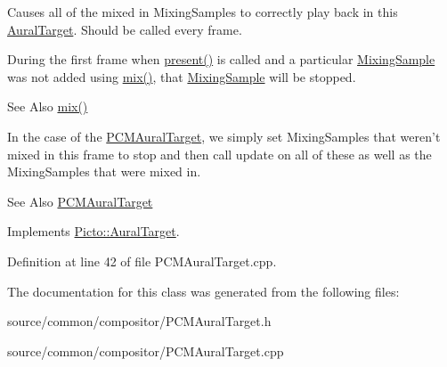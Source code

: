 Causes all of the mixed in Mixing\-Samples to correctly play back in this \hyperlink{class_picto_1_1_aural_target}{Aural\-Target}. Should be called every frame. 

During the first frame when \hyperlink{class_picto_1_1_p_c_m_aural_target_a61b64002c04ef85b30be6a24c04b43f5}{present()} is called and a particular \hyperlink{class_picto_1_1_mixing_sample}{Mixing\-Sample} was not added using \hyperlink{class_picto_1_1_p_c_m_aural_target_a17bce3805e561894eacd5ac20bc8cc2a}{mix()}, that \hyperlink{class_picto_1_1_mixing_sample}{Mixing\-Sample} will be stopped. \begin{DoxySeeAlso}{See Also}
\hyperlink{class_picto_1_1_p_c_m_aural_target_a17bce3805e561894eacd5ac20bc8cc2a}{mix()}
\end{DoxySeeAlso}
In the case of the \hyperlink{class_picto_1_1_p_c_m_aural_target}{P\-C\-M\-Aural\-Target}, we simply set Mixing\-Samples that weren't mixed in this frame to stop and then call update on all of these as well as the Mixing\-Samples that were mixed in. \begin{DoxySeeAlso}{See Also}
\hyperlink{class_picto_1_1_p_c_m_aural_target}{P\-C\-M\-Aural\-Target} 
\end{DoxySeeAlso}


Implements \hyperlink{class_picto_1_1_aural_target_a75d7885362d309900041bb7b02c3cfa1}{Picto\-::\-Aural\-Target}.



Definition at line 42 of file P\-C\-M\-Aural\-Target.\-cpp.



The documentation for this class was generated from the following files\-:\begin{DoxyCompactItemize}
\item 
source/common/compositor/P\-C\-M\-Aural\-Target.\-h\item 
source/common/compositor/P\-C\-M\-Aural\-Target.\-cpp\end{DoxyCompactItemize}
